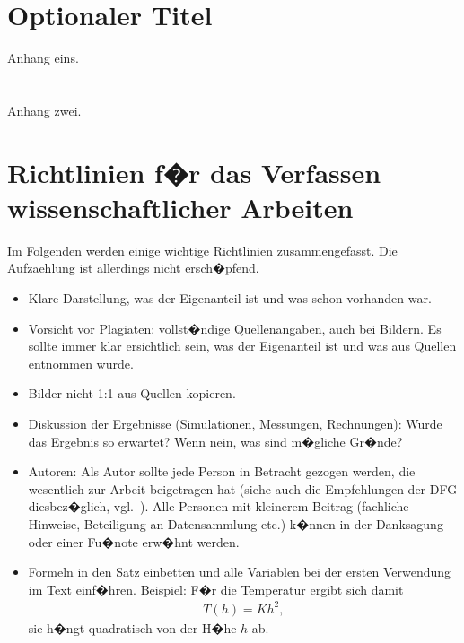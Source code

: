 \documentclass[journal,final,a4paper,twoside]{PS}
\begin{document}
\section{Optionaler Titel}
Anhang eins.
\section{}
Anhang zwei.

\section{Richtlinien f�r das Verfassen wissenschaftlicher Arbeiten}
\label{sec:richtlinien}
Im Folgenden werden einige wichtige Richtlinien zusammengefasst. Die Aufzaehlung ist allerdings nicht ersch�pfend.

\begin{itemize}
 \item Klare Darstellung, was der Eigenanteil ist und was schon vorhanden war.
 \item Vorsicht vor Plagiaten: vollst�ndige Quellenangaben, auch bei Bildern. Es sollte immer klar ersichtlich sein, was der Eigenanteil ist und was aus Quellen entnommen wurde.
 \item Bilder nicht 1:1 aus Quellen kopieren.
 \item Diskussion der Ergebnisse (Simulationen, Messungen, Rechnungen): Wurde das Ergebnis so erwartet? Wenn nein, was sind m�gliche Gr�nde?
 \item Autoren: Als Autor sollte jede Person in Betracht gezogen werden, die wesentlich zur Arbeit beigetragen hat (siehe auch die Empfehlungen der DFG diesbez�glich, vgl.~\cite{wissPraxis:DFG}). Alle Personen mit kleinerem Beitrag (fachliche Hinweise, Beteiligung an Datensammlung etc.) k�nnen in der Danksagung oder einer Fu�note erw�hnt werden.
\item Formeln in den Satz einbetten und alle Variablen bei der ersten Verwendung im Text einf�hren. Beispiel:
 F�r die Temperatur ergibt sich damit
 \begin{align*}
  T(h) = K h^2,
 \end{align*}
 sie h�ngt quadratisch von der H�he $h$ ab.
\end{itemize}
\end{document}
